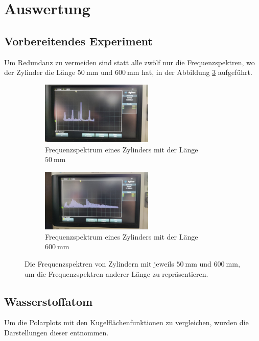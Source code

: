 \section{Auswertung}
\label{sec:Auswertung}
\subsection{Vorbereitendes Experiment}
Um Redundanz zu vermeiden sind statt alle zwölf nur die Frequenzspektren, wo der Zylinder die Länge $\qty{50}{\milli\meter}$ und $\qty{600}{\milli\meter}$ hat, in der Abbildung
\ref{fig:os} aufgeführt.
\begin{figure}
\begin{subfigure}{0.48\textwidth}%
\centering%
\includegraphics[height=3cm]{data_scripts/1.jpeg}%
\caption{Frequenzspektrum eines Zylinders mit der Länge $\qty{50}{\milli\meter}$}%
\label{fig:50os}%
\end{subfigure}%
\hfill%
\begin{subfigure}{0.48\textwidth}%
\centering%
\includegraphics[height=3cm]{data_scripts/12.jpeg}%
\caption{Frequenzspektrum eines Zylinders mit der Länge $\qty{600}{\milli\meter}$}%
\label{fig:600os}%
\end{subfigure}%
\caption{Die Frequenzspektren von Zylindern mit jeweils $\qty{50}{\milli\meter}$ und $\qty{600}{\milli\meter}$, um die Frequenzspektren anderer Länge zu repräsentieren.}%
\label{fig:os}%
\end{figure}%


\subsection{Wasserstoffatom}
Um die Polarplots mit den Kugelflächenfunktionen zu vergleichen, wurden die Darstellungen dieser \cite{sphericalharmonics} entnommen.

